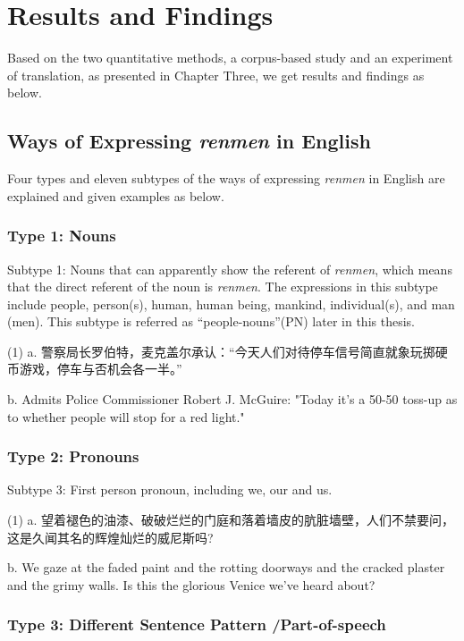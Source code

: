 \documentclass[degree=bachelor,language=english]{thuthesis}
\begin{document}
\chapter{Results and Findings}

Based on the two quantitative methods, a corpus-based study and an experiment of translation, as presented in Chapter Three, we get results and findings as below.



\section{Ways of Expressing \emph{renmen} in English}

Four types and eleven subtypes of the ways of expressing \emph{renmen} in English are explained and given examples as below.


\subsection{Type 1: Nouns}

Subtype 1: Nouns that can apparently show the referent of \emph{renmen}, which means that the direct referent of the noun is \emph{renmen}. The expressions in this subtype include people, person(s), human, human being, mankind, individual(s), and man (men). This subtype is referred as “people-nouns”(PN) later in this thesis.

(1) a. 警察局长罗伯特，麦克盖尔承认：“今天人们对待停车信号简直就象玩掷硬币游戏，停车与否机会各一半。”

b. Admits Police Commissioner Robert J. McGuire: "Today it's a 50-50 toss-up as to whether people will stop for a red light."


\subsection{Type 2: Pronouns}

Subtype 3: First person pronoun, including we, our and us.

(1) a. 望着褪色的油漆、破破烂烂的门庭和落着墙皮的肮脏墙壁，人们不禁要问，这是久闻其名的辉煌灿烂的威尼斯吗?

b. We gaze at the faded paint and the rotting doorways and the cracked plaster and the grimy walls. Is this the glorious Venice we've heard about?


\subsection{Type 3: Different Sentence Pattern /Part-of-speech}
\end{document}
